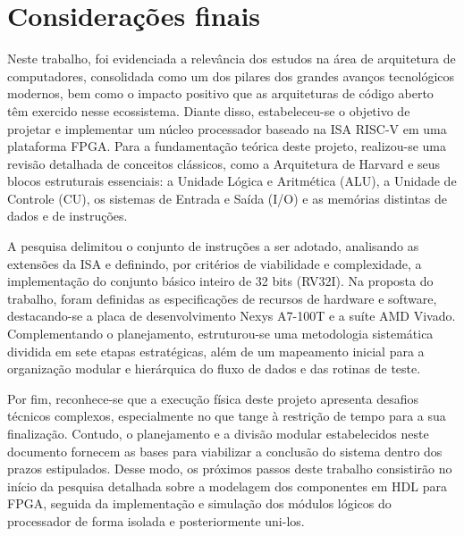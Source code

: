 \chapter{Considerações finais}\label{cap:conclusoes}

Neste trabalho, foi evidenciada a relevância dos estudos na área de arquitetura de computadores, consolidada como um dos pilares dos grandes avanços tecnológicos modernos, bem como o impacto positivo que as arquiteturas de código aberto têm exercido nesse ecossistema. Diante disso, estabeleceu-se o objetivo de projetar e implementar um núcleo processador baseado na ISA RISC-V em uma plataforma FPGA. Para a fundamentação teórica deste projeto, realizou-se uma revisão detalhada de conceitos clássicos, como a Arquitetura de Harvard e seus blocos estruturais essenciais: a Unidade Lógica e Aritmética (ALU), a Unidade de Controle (CU), os sistemas de Entrada e Saída (I/O) e as memórias distintas de dados e de instruções.

A pesquisa delimitou o conjunto de instruções a ser adotado, analisando as extensões da ISA e definindo, por critérios de viabilidade e complexidade, a implementação do conjunto básico inteiro de 32 bits (RV32I). Na proposta do trabalho, foram definidas as especificações de recursos de hardware e software, destacando-se a placa de desenvolvimento Nexys A7-100T e a suíte AMD Vivado. Complementando o planejamento, estruturou-se uma metodologia sistemática dividida em sete etapas estratégicas, além de um mapeamento inicial para a organização modular e hierárquica do fluxo de dados e das rotinas de teste.

Por fim, reconhece-se que a execução física deste projeto apresenta desafios técnicos complexos, especialmente no que tange à restrição de tempo para a sua finalização. Contudo, o planejamento e a divisão modular estabelecidos neste documento fornecem as bases para viabilizar a conclusão do sistema dentro dos prazos estipulados. Desse modo, os próximos passos deste trabalho consistirão no início da pesquisa detalhada sobre a modelagem dos componentes em HDL para FPGA, seguida da implementação e simulação dos módulos lógicos do processador de forma isolada e posteriormente uni-los.